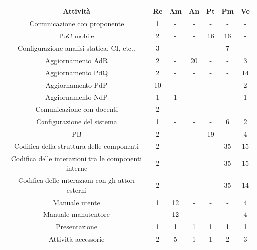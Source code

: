 \begin{table}[H]
	\centering
	\begin{tabular}{|c|c|c|c|c|c|c|}
		\hline
		\rowcolor{lighter-grayer}
		\textbf{Attività} & \textbf{Re}        & \textbf{Am}        & \textbf{An}        & \textbf{Pt}        & \textbf{Pm}        & \textbf{Ve}        \\ \hline

	Comunicazione con proponente              & 1                  & -  & -  & -  & -  & -  \\ \hline
	PoC mobile                                & 2                  & -  & -  & 16 & 16 & -  \\ \hline
	Configurazione analisi statica, CI, etc.. & 3                  & -  & -  & -  & 7  & -  \\ \hline
	Aggiornamento AdR                         & 2                  & -  & 20 & -  & -  & 3  \\ \hline
	Aggiornamento PdQ                         & 2                  & -  & -  & -  & -  & 14 \\ \hline
	Aggiornamento PdP                         & 10                 & -  & -  & -  & -  & 2  \\ \hline
	Aggiornamento NdP                         & 1                  & 1  & -  & -  & -  & 1  \\ \hline
	Comunicazione con docenti                 & 2                  & -  & -  & -  & -  & -  \\ \hline
	Configurazione del sistema                & 1                  & -  & -  & -  & 6  & 2  \\ \hline
	PB                                        & 2                  & -  & -  & 19 & -  & 4  \\ \hline
	Codifica della struttura delle componenti & 2                  & -  & -  & -  & 35 & 15 \\ \hline
	Codifica delle interazioni tra le componenti interne & 2           & -           & -           & -           & 35          & 15          \\ \hline
	Codifica delle interazioni con gli attori esterni    & 2           & -           & -           & -           & 35          & 14          \\ \hline
	Manuale utente                            & 1 & 12 & -  & -  & -  & 4 \\ \hline
	Manuale manutentore                       &                    & 12 & -  & -  & -  & 4  \\ \hline
	Presentazione                             & 1                  & 1  & 1  & 1  & 1  & 1  \\ \hline
	Attività accessorie                       & 2                  & 5  & 1  & 1  & 2  & 3  \\ \hline
	
	\end{tabular}
\end{table}

